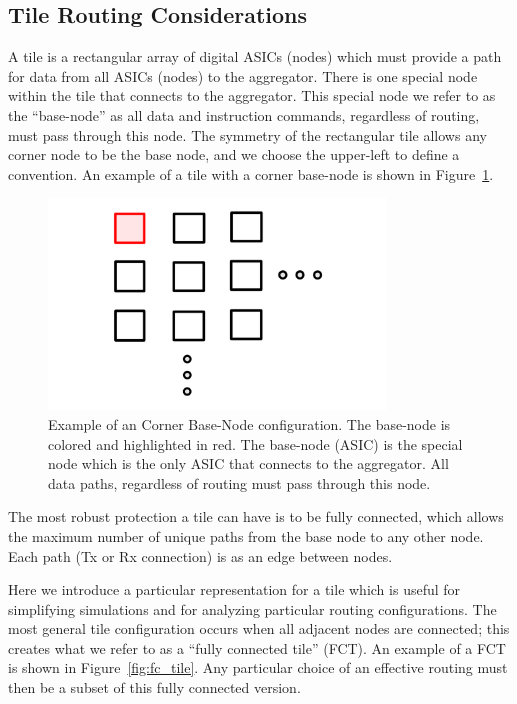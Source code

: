 \subsection{Tile Routing Considerations}\label{sec:tile_sim}
A tile is a rectangular array of digital ASICs (nodes) which must provide a path for data from all ASICs (nodes) to the aggregator.
There is one special node within the tile that connects to the aggregator.
This special node we refer to as the ``base-node'' as all data and instruction commands, regardless of routing, must pass through this node.
The symmetry of the rectangular tile allows any corner node to be the base node, and we choose the upper-left to define a convention.
An example of a tile with a corner base-node is shown in Figure~\ref{fig:cbn}.

\begin{figure}[]
\centering
\includegraphics[width=0.8\textwidth]{images/CBN.pdf}
\caption{Example of an Corner Base-Node configuration.
The base-node is colored and highlighted in red.
The base-node (ASIC) is the special node which is the only ASIC that connects to the aggregator. 
All data paths, regardless of routing must pass through this node.
}
\label{fig:cbn}
\end{figure}

The most robust protection a tile can have is to be fully connected, which allows the maximum number of unique paths from the base node to any other node.
Each path (Tx or Rx connection) is as an edge between nodes.

Here we introduce a particular representation for a tile which is useful for simplifying simulations and for analyzing particular routing configurations.
The most general tile configuration occurs when all adjacent nodes are connected; this creates what we refer to as a ``fully connected tile'' (FCT).
An example of a FCT is shown in Figure~\ref{fig:fc_tile}.
Any particular choice of an effective routing must then be a subset of this fully connected version.

